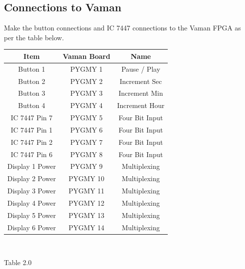\documentclass[conference]{IEEEtran}
\begin{document}
\subsection{Connections to Vaman}
\raggedright
Make the button connections and IC 7447 connections to the Vaman FPGA as per the table below.\\
\vspace{0.25cm}
\centering
\begin{tabular}{|c|c|c|}
\hline
Item & Vaman Board & Name\\
\hline
Button 1 & PYGMY 1 & Pause / Play\\
\hline
Button 2 & PYGMY 2 & Increment Sec\\
\hline
Button 3 & PYGMY 3 & Increment Min\\
\hline
Button 4 & PYGMY 4 & Increment Hour\\
\hline
IC 7447 Pin 7 & PYGMY 5 & Four Bit Input\\
\hline
IC 7447 Pin 1 & PYGMY 6 & Four Bit Input\\
\hline
IC 7447 Pin 2 & PYGMY 7 & Four Bit Input\\
\hline
IC 7447 Pin 6 & PYGMY 8 & Four Bit Input\\
\hline
Display 1 Power & PYGMY 9 & Multiplexing\\
\hline
Display 2 Power & PYGMY 10 & Multiplexing\\
\hline
Display 3 Power & PYGMY 11 & Multiplexing\\
\hline
Display 4 Power & PYGMY 12 & Multiplexing\\
\hline
Display 5 Power & PYGMY 13 & Multiplexing\\
\hline
Display 6 Power & PYGMY 14 & Multiplexing\\
\hline

\end{tabular}\\
\centerline{Table 2.0}
\end{document}
